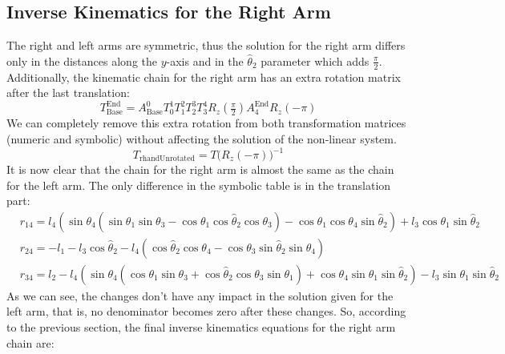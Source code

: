 \subsection{Inverse Kinematics for the Right Arm}

The right and left arms are symmetric, thus the solution for the right arm differs only in the distances along the $y$-axis and in the $\widehat{\theta}_2$ parameter which adds $\frac{\pi}{2}$. Additionally, the kinematic chain for the right arm has an extra rotation matrix after the last translation:
\[
T^\text{End}_\text{Base} = A^0_\text{Base}T^1_0T^2_1T^3_2T^4_3R_z(\tfrac{\pi}{2})A^\text{End}_{4}R_z(-\pi)
\]
We can completely remove this extra rotation from both transformation matrices (numeric and symbolic) without affecting the solution of the non-linear system. 
\[
T_\text{rhandUnrotated} = T{\big(R_z(-\pi)\big)}^{-1}
\]
It is now clear that the chain for the right arm is almost the same as the chain for the left arm. The only difference in the symbolic table is in the translation part:
\begin{align*}
&r_{14} = l_4\left(\sin\theta_4\left(\sin\theta_1\sin\theta_3 - \cos\theta_1\cos\widehat{\theta}_2\cos\theta_3\right) - \cos\theta_1\cos\theta_4\sin\widehat{\theta}_2\right) + l_3\cos\theta_1\sin\widehat{\theta}_2\\
&r_{24} = -l_1 - l_3\cos\widehat{\theta}_2 - l_4\left(\cos\widehat{\theta}_2\cos\theta_4 - \cos\theta_3\sin\widehat{\theta}_2\sin\theta_4\right)\\
&r_{34} = l_2 - l_4\left(\sin\theta_4\left(\cos\theta_1\sin\theta_3 + \cos\widehat{\theta}_2\cos\theta_3\sin\theta_1\right) + \cos\theta_4\sin\theta_1\sin\widehat{\theta}_2\right) - l_3\sin\theta_1\sin\widehat{\theta}_2
\end{align*}
As we can see, the changes don't have any impact in the solution given for the left arm, that is, no denominator becomes zero after these changes. So, according to the previous section, the final inverse kinematics equations for the right arm chain are:
